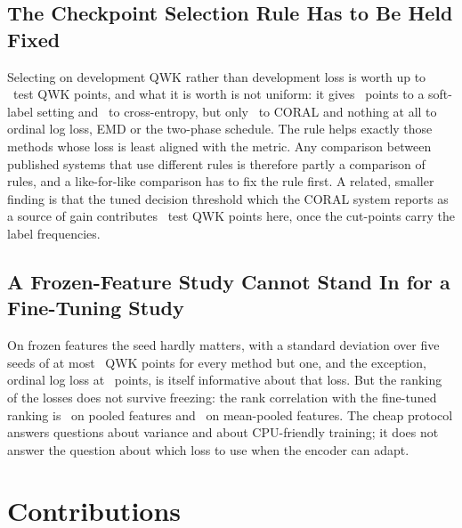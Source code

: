 \subsection{The Checkpoint Selection Rule Has to Be Held Fixed}

Selecting on development QWK rather than development loss is worth up to
\qwkselTestGainMax\ test QWK points, and what it is worth is not uniform: it gives
\qwkselTestGainSoftThree\ points to a soft-label setting and \qwkselTestGainCE\ to
cross-entropy, but only \qwkselTestGainCoral\ to CORAL and nothing at all to ordinal log loss,
EMD or the two-phase schedule. The rule helps exactly those methods whose loss is least aligned
with the metric. Any comparison between published systems that use different rules is therefore
partly a comparison of rules, and a like-for-like comparison has to fix the rule first. A
related, smaller finding is that the tuned decision threshold which the CORAL system reports as
a source of gain contributes \zaiTestGainCoral\ test QWK points here, once the cut-points carry
the label frequencies.

\subsection{A Frozen-Feature Study Cannot Stand In for a Fine-Tuning Study}

On frozen features the seed hardly matters, with a standard deviation over five seeds of at most
\cpuStdMaxQwk\ QWK points for every method but one, and the exception, ordinal log loss at
\cpuStdOll\ points, is itself informative about that loss. But the ranking of the losses does
not survive freezing: the rank correlation with the fine-tuned ranking is
\cpuSpearmanPooler\ on pooled features and \cpuSpearmanMean\ on mean-pooled features. The cheap
protocol answers questions about variance and about CPU-friendly training; it does not answer
the question about which loss to use when the encoder can adapt.

\section{Contributions}

